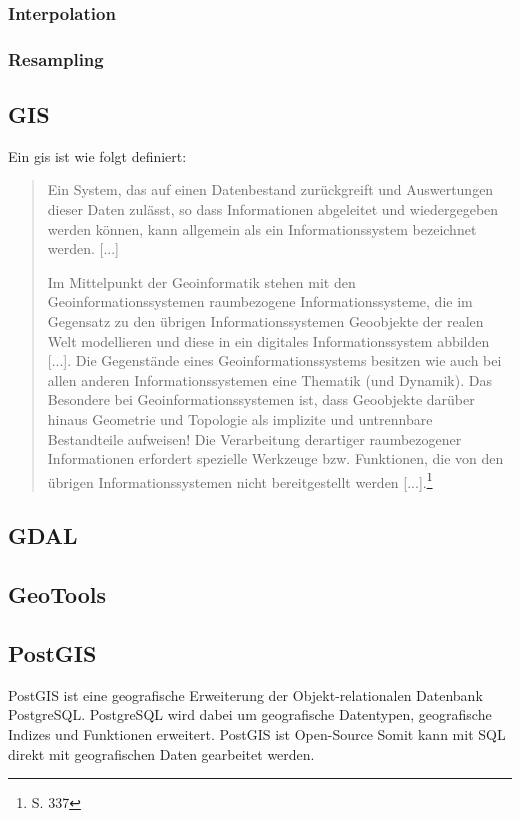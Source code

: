 \subsubsection{Interpolation}

\subsubsection{Resampling}


\subsection{GIS}
\label{grundlagen:gis}

Ein \Gls{gis} ist wie folgt definiert:
\begin{quote}
Ein System,  das  auf einen Datenbestand zurückgreift und Auswertungen dieser Daten zulässt,  so dass Informationen abgeleitet und wiedergegeben werden können,  kann  allgemein  als  ein  Informationssystem  bezeichnet  werden. [...]

Im Mittelpunkt  der  Geoinformatik  stehen  mit den  Geoinformationssystemen raumbezogene Informationssysteme, die im Gegensatz zu den übrigen Informationssystemen Geoobjekte  der realen Welt modellieren und diese in ein digitales Informationssystem abbilden [...]. Die Gegenstände eines Geoinformationssystems  besitzen  wie  auch  bei  allen  anderen  Informationssystemen  eine 
Thematik (und Dynamik). Das Besondere bei Geoinformationssystemen ist, dass Geoobjekte darüber hinaus Geometrie und Topologie als implizite und untrennbare Bestandteile aufweisen!  Die Verarbeitung derartiger raumbezogener Informationen erfordert spezielle Werkzeuge bzw. Funktionen, die von den übrigen Informationssystemen nicht bereitgestellt werden [...].\footnote{\cite{book:gi-theopluspraxis3} S. 337}
\end{quote}

\subsection{GDAL}

\subsection{GeoTools}

\subsection{PostGIS}
PostGIS ist eine geografische Erweiterung der Objekt-relationalen Datenbank PostgreSQL.
PostgreSQL wird dabei um geografische Datentypen, geografische Indizes und Funktionen erweitert.
PostGIS ist Open-Source
Somit kann mit SQL direkt mit geografischen Daten gearbeitet werden.




